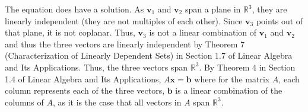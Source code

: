 \documentclass[11pt]{scrartcl}
\theoremstyle{dotlessP}
\theoremstyle{dotlessN}
\newcommand{\reals}{\mathbb{R}} %
\begin{document}
The equation does have a solution. As $\textbf{v}_1$ and  $\textbf{v}_2$ span a plane in $\reals^3$, they are linearly independent (they are not multiples of each other). Since  $\textbf{v}_3$ points out of that plane, it is not coplanar. Thus, $\textbf{v}_3$ is not a linear combination of  $\textbf{v}_1$ and  $\textbf{v}_2$ and thus the three vectors are linearly independent by Theorem 7 (Characterization of Linearly Dependent Sets) in Section 1.7 of Linear Algebra and Its Applications. Thus, the three vectors span  $\reals^3$. By Theorem 4 in Section 1.4 of Linear Algebra and Its Applications, $A\textbf{x} = \textbf{b}$ where for the matrix $A$, each column represents each of the three vectors, $\textbf{b}$ is a linear combination of the columns of $A$, as it is the case that all vectors in $A$ span $\reals^3$.
\\
\end{document}
